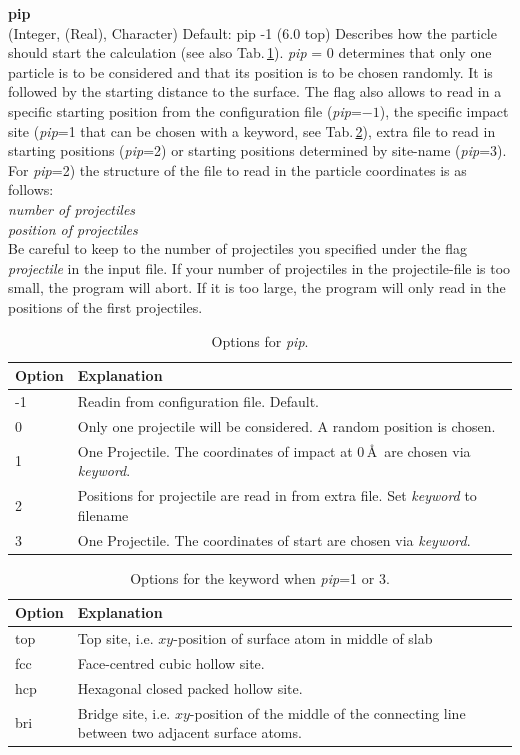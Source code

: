 \documentclass[twoside, 11pt, titlepage, captions=nooneline, a4paper, headsepline]{scrbook}%
\begin{document}
\noindent\textbf{pip}\\
(Integer, (Real), Character)
Default: pip -1 (6.0 top)
Describes how the particle should start the calculation (see also Tab.\,\ref{Tab:mxt:pip}). \textit{pip} = 0 determines that only one particle is to be considered and that its position is to be chosen randomly. It is followed by the starting distance to the surface. The flag also allows to read in a specific starting position from the configuration file (\textit{pip}=$-1$), the specific impact site (\textit{pip}=1 that can be chosen with a keyword, see Tab.\,\ref{Tab:mxt:pip_keyword}), extra file to read in starting positions (\textit{pip}=2) or starting positions determined by site-name (\textit{pip}=3). For \textit{pip}=2) the structure of the file to read in the particle coordinates is as follows:\\
\emph{number of projectiles}\\
\emph{position of projectiles}\\
Be careful to keep to the number of projectiles you specified under the flag \emph{projectile} in the input file. If your number of projectiles in the projectile-file is too small, the program will abort. If it is too large, the program will only read in the positions of the first projectiles.\\

\begin{table}[t!]
\centering
\caption{Options for \emph{pip}.}
\label{Tab:mxt:pip}
\begin{tabular}{p{2cm}p{11cm}}
\hline\hline
Option&Explanation\\
\hline
-1 & Readin from configuration file. Default.\\
0 & Only one projectile will be considered. A random position is chosen. \\
1 & One Projectile. The coordinates of impact at 0\,\AA~are chosen via \emph{keyword}.\\
2 & Positions for projectile are read in from extra file. Set \emph{keyword} to filename\\
3 & One Projectile. The coordinates of start are chosen via \emph{keyword}.\\ 
\hline
\end{tabular}
\end{table}
\begin{table}[b!]
\centering
\caption{Options for the keyword when \emph{pip}=1 or 3.}
\label{Tab:mxt:pip_keyword}
\begin{tabular}{p{2cm}p{11cm}}
\hline\hline
Option&Explanation\\
\hline
top& Top site, i.e. $xy$-position of surface atom in middle of slab\\
fcc& Face-centred cubic hollow site.\\
hcp& Hexagonal closed packed hollow site.\\
bri& Bridge site, i.e. $xy$-position of the middle of the connecting line between two adjacent surface atoms.\\
\hline
\end{tabular}
\end{table}
\end{document}
